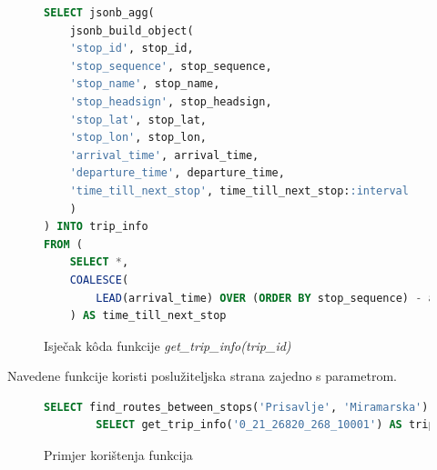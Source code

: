 \documentclass[zavrsnirad]{fer}
\begin{document}
\begin{figure}[h]
	\centering
	\begin{minipage}{0.8\linewidth}
		\begin{lstlisting}[language=SQL]
SELECT jsonb_agg(
	jsonb_build_object(
	'stop_id', stop_id,
	'stop_sequence', stop_sequence,
	'stop_name', stop_name,
	'stop_headsign', stop_headsign,
	'stop_lat', stop_lat,
	'stop_lon', stop_lon,
	'arrival_time', arrival_time,
	'departure_time', departure_time,
	'time_till_next_stop', time_till_next_stop::interval
	)
) INTO trip_info
FROM (
	SELECT *,
	COALESCE(
		LEAD(arrival_time) OVER (ORDER BY stop_sequence) - arrival_time, INTERVAL '0 seconds'
	) AS time_till_next_stop

		\end{lstlisting}
	\end{minipage}
	\caption{Isječak k\^oda funkcije \textit{get\_trip\_info(trip\_id)}}
	\label{slk:sqlfunkcija}
\end{figure}

Navedene funkcije koristi poslužiteljska strana zajedno s parametrom.
\begin{figure}[h]
	\centering
	\begin{minipage}{0.9\linewidth}
		\begin{lstlisting}[language=SQL]
		SELECT find_routes_between_stops('Prisavlje', 'Miramarska') AS routes
		SELECT get_trip_info('0_21_26820_268_10001') AS trip_info
		\end{lstlisting}
	\end{minipage}
	\caption{Primjer korištenja funkcija}
	\label{slk:sqlprimjer}
\end{figure}
\end{document}
